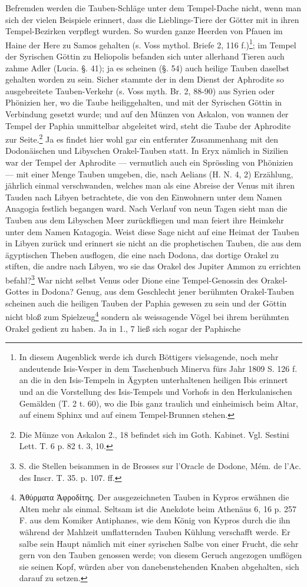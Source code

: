 \documentclass[a4paper, 11pt, oneside, polutonikogreek, german]{article}
\begin{document}
Befremden werden die Tauben-Schläge unter dem Tempel-Dache nicht, wenn man sich der vielen Beispiele erinnert, dass die Lieblings-Tiere der Götter mit in ihren Tempel-Bezirken verpflegt wurden. So wurden ganze Heerden von Pfauen im Haine der Here zu Samos gehalten (s. Voss mythol. Briefe 2, 116 f.)\footnote{In diesem Augenblick werde ich durch Böttigers vielsagende, noch mehr andeutende Isis-Vesper in dem Taschenbuch Minerva fürs Jahr 1809 S. 126 f. an die in den Isis-Tempeln in Ägypten unterhaltenen heiligen Ibis erinnert und an die Vorstellung des Isis-Tempels und Vorhofs in den Herkulanischen Gemälden (T. 2 t. 60), wo die Ibis ganz traulich und einheimisch beim Altar, auf einem Sphinx und auf einem Tempel-Brunnen stehen.}; im Tempel der Syrischen Göttin zu Heliopolis befanden sich unter allerhand Tieren auch zahme Adler (Lucia. §. 41); ja es scheinen (§. 54) auch heilige Tauben daselbst gehalten worden zu sein. Sicher stammte der in dem Dienst der Aphrodite so ausgebreitete Tauben-Verkehr (s. Voss myth. Br. 2, 88-90) aus Syrien oder Phönizien her, wo die Taube heiliggehalten, und mit der Syrischen Göttin in Verbindung gesetzt wurde; und auf den Münzen von Askalon, von wannen der Tempel der Paphia unmittelbar abgeleitet wird, steht die Taube der Aphrodite zur Seite.\footnote{Die Münze von Askalon 2., 18 befindet sich im Goth. Kabinet. Vgl. Sestini Lett. T. 6 p. 82 t. 3, 10.} Ja es findet hier wohl gar ein entfernter Zusammenhang mit den Dodonäischen und Libyschen Orakel-Tauben statt. In Eryx nämlich in Sizilien war der Tempel der Aphrodite --- vermutlich auch ein Sprössling von Phönizien --- mit einer Menge Tauben umgeben, die, nach Aelians (H. N. 4, 2) Erzählung, jährlich einmal verschwanden, welches man als eine Abreise der Venus mit ihren Tauden nach Libyen betrachtete, die von den Einwohnern unter dem Namen Anagogia festlich begangen ward. Nach Verlauf von neun Tagen sieht man die Tauben aus dem Libyschen Meer zurückfliegen und man feiert ihre Heimkehr unter dem Namen Katagogia. Weist diese Sage nicht auf eine Heimat der Tauben in Libyen zurück und erinnert sie nicht an die prophetischen Tauben, die aus dem ägyptischen Theben ausflogen, die eine nach Dodona, das dortige Orakel zu stiften, die andre nach Libyen, wo sie das Orakel des Jupiter Ammon zu errichten befahl?\footnote{S. die Stellen beisammen in de Brosses sur l'Oracle de Dodone, Mém. de l'Ac. des Inscr. T. 35. p. 107. ff.} War nicht selbst Venus oder Dione eine Tempel-Genossin des Orakel-Gottes in Dodona? Genug, aus dem Geschlecht jener berühmten Orakel-Tauben scheinen auch die heiligen Tauben der Paphia gewesen zu sein und der Göttin nicht bloß zum Spielzeug\footnote{Ἀθύρματα Ἀφροδίτης. Der ausgezeichneten Tauben in Kypros erwähnen die Alten mehr als einmal. Seltsam ist die Anekdote beim Athenäus 6, 16 p. 257 F. aus dem Komiker Antiphanes, wie dem König von Kypros durch die ihn während der Mahlzeit umflatternden Tauben Kühlung verschafft werde. Er salbe sein Haupt nämlich mit einer syrischen Salbe von einer Frucht, die sehr gern von den Tauben genossen werde; von diesem Geruch angezogen umflögen sie seinen Kopf, würden aber von danebenstehenden Knaben abgehalten, sich darauf zu setzen.} sondern als weissagende Vögel bei ihrem berühmten Orakel gedient zu haben. Ja in 1., 7 ließ sich sogar der Paphische 
\end{document}
